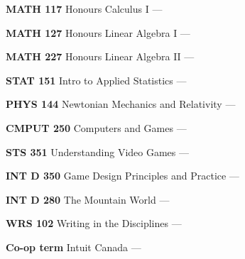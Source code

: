 \begin{cventries}
{\begin{cvitems}
      \item {\textbf{MATH 117} Honours Calculus I --- }
        \vspace{0.5mm}
      \item {\textbf{MATH 127} Honours Linear Algebra I --- }
        \vspace{0.5mm}
      \item {\textbf{MATH 227} Honours Linear Algebra II --- }
        \vspace{0.5mm}
      \item {\textbf{STAT 151} Intro to Applied Statistics --- }
        \vspace{0.5mm}
      \item {\textbf{PHYS 144} Newtonian Mechanics and Relativity --- }
        \vspace{1.5mm}

      \item {\textbf{CMPUT 250} Computers and Games --- }
        \vspace{0.5mm}
      \item {\textbf{STS 351} Understanding Video Games --- }
        \vspace{0.5mm}
      \item {\textbf{INT D 350} Game Design Principles and Practice --- }
        \vspace{1.5mm}

      \item {\textbf{INT D 280} The Mountain World --- }
        \vspace{0.5mm}
      \item {\textbf{WRS 102} Writing in the Disciplines --- }
        \vspace{1.5mm}

      \item {\textbf{Co-op term} Intuit Canada --- }
        \vspace{1.5mm}
      \end{cvitems}
    }
\end{cventries}
